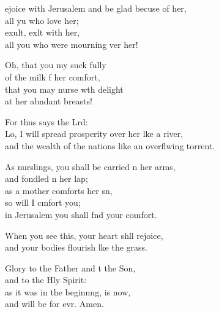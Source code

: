 \settowidth{\versewidth}{and the wealth of the nations like an overflowing torrent.}
\begin{psalmverse}%
  \begin{patverse}
ejoice with Jerusalem and be glad becuse of her,\Med\\
all yu who love her;\\
exult, exlt with her,\Med\\
all you who were mourning ver her!

Oh, that you my suck fully\Med\\
of the milk f her comfort,\\
that you may nurse w\pointup{\i}th delight\Med\\
at her abndant breasts!

For thus says the Lrd:\Flex\\
Lo, I will spread prosperity over her l\pointup{\i}ke a river,\Med\\
and the wealth of the nations like an overflwing torrent.

As nurslings, you shall be carried \pointup{\i}n her arms,\Med\\
and fondled \pointup{\i}n her lap;\\
as a mother comforts her sn,\Flex\\
so will I cmfort you;\Med\\
in Jerusalem you shall f\pointup{\i}nd your comfort.

When you see this, your heart shll rejoice,\Med\\
and your bodies flourish l\pointup{\i}ke the grass.

Glory to the Father and t the Son,\Med\\
and to the Hly Spirit:\\
as it was in the beginn\pointup{\i}ng, is now,\Med\\
and will be for evr. Amen.
  \end{patverse}
\end{psalmverse}
